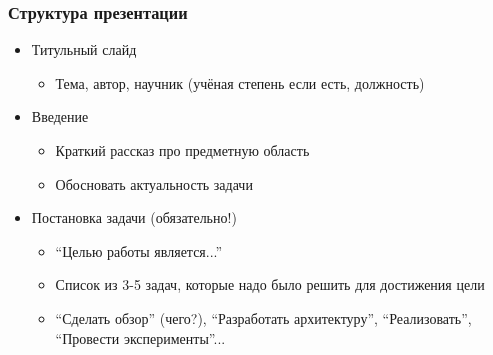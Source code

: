 \documentclass[xetex,mathserif,serif]{beamer}
\begin{document}
    \begin{frame}
        \frametitle{Структура презентации}
        \begin{itemize}
            \item Титульный слайд 
            \begin{itemize}
                \item Тема, автор, научник (учёная степень если есть, должность)
            \end{itemize}
            \item Введение
            \begin{itemize}
                \item Краткий рассказ про предметную область
                \item Обосновать актуальность задачи
            \end{itemize}
            \item Постановка задачи (обязательно!)
            \begin{itemize}
                \item ``Целью работы является...''
                \item Список из 3-5 задач, которые надо было решить для достижения цели
                \item ``Сделать обзор'' (чего?), ``Разработать архитектуру'', ``Реализовать'', ``Провести эксперименты''...
            \end{itemize}
        \end{itemize}
    \end{frame}
\end{document}

